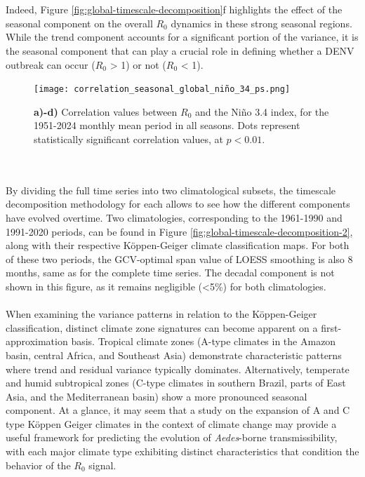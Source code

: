 \documentclass[10pt,twocolumn]{wlscirep}
\begin{document}
\\
\\
Indeed, Figure \ref{fig:global-timescale-decomposition}f highlights the effect of the seasonal component on the overall $R_0$ dynamics in these strong seasonal regions. While the trend component accounts for a significant portion of the variance, it is the seasonal component that can play a crucial role in defining whether a DENV outbreak can occur ($R_0$ > 1) or not ($R_0$ < 1).
\begin{figure}[!ht]
  \centering
  \texttt{[image: correlation\_seasonal\_global\_niño\_34\_ps.png]}
  \caption{\textbf{a)-d)} Correlation values between $R_0$ and the Niño 3.4 index, for the 1951-2024 monthly mean period in all seasons. Dots represent statistically significant correlation values, at $p < 0.01$.}
  \label{fig:global-correlation-niño-34}
\end{figure}
\\
\\
By dividing the full time series into two climatological subsets, the timescale decomposition methodology for each allows to see how the different components have evolved overtime. Two climatologies, corresponding to the 1961-1990 and 1991-2020 periods, can be found in Figure \ref{fig:global-timescale-decomposition-2}, along with their respective Köppen-Geiger climate classification maps\cite{beck_2023}. For both of these two periods, the GCV-optimal span value of LOESS smoothing is also 8 months, same as for the complete time series. The decadal component is not shown in this figure, as it remains negligible (<5\%) for both climatologies.
\\
\\
When examining the variance patterns in relation to the Köppen-Geiger classification, distinct climate zone signatures can become apparent on a first-approximation basis. Tropical climate zones (A-type climates in the Amazon basin, central Africa, and Southeast Asia) demonstrate characteristic patterns where trend and residual variance typically dominates. Alternatively, temperate and humid subtropical zones (C-type climates in southern Brazil, parts of East Asia, and the Mediterranean basin) show a more pronounced seasonal component. At a glance, it may seem that a study on the expansion of A and C type Köppen Geiger climates in the context of climate change may provide a useful framework for predicting the evolution of \textit{Aedes}-borne transmissibility, with each major climate type exhibiting distinct characteristics that condition the behavior of the $R_0$ signal.
\end{document}
